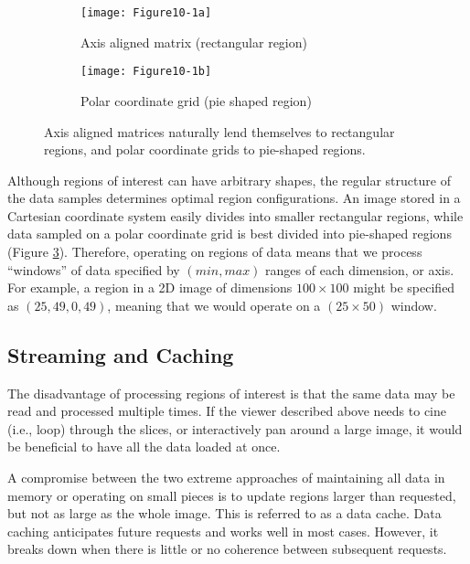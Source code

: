 \begin{figure}[htb]
	\begin{subfigure}[h]{0.36\linewidth}
		\texttt{[image: Figure10-1a]}
		\captionsetup{justification=centering}
		\caption*{Axis aligned matrix (rectangular region)}
		\label{fig:Figure10-1a}
	\end{subfigure}
	\hfill
	\begin{subfigure}[h]{0.36\linewidth}
	\end{subfigure}
	\hfill
	\begin{subfigure}[h]{0.36\linewidth}
		\texttt{[image: Figure10-1b]}
		\captionsetup{justification=centering}
		\caption*{Polar coordinate grid (pie shaped region)}
		\label{fig:Figure10-1b}
	\end{subfigure}
	\caption{Axis aligned matrices naturally lend themselves to rectangular regions, and polar coordinate grids to pie-shaped regions.}\label{fig:Figure10-1}
\end{figure}

Although regions of interest can have arbitrary shapes, the regular structure of the data samples determines optimal region configurations. An image stored in a Cartesian coordinate system easily divides into smaller rectangular regions, while data sampled on a polar coordinate grid is best divided into pie-shaped regions (Figure \ref{fig:Figure10-1}). Therefore, operating on regions of data means that we process ``windows'' of data specified by $(min,max)$ ranges of each dimension, or axis. For example, a region in a 2D image of dimensions $100 \times 100$ might be specified as $(25,49, 0,49)$, meaning that we would operate on a $(25 \times 50)$ window.

\subsection{Streaming and Caching}

The disadvantage of processing regions of interest is that the same data may be read and processed multiple times. If the viewer described above needs to cine (i.e., loop) through the slices, or interactively pan around a large image, it would be beneficial to have all the data loaded at once.

A compromise between the two extreme approaches of maintaining all data in memory or operating on small pieces is to update regions larger than requested, but not as large as the whole image. This is referred to as a data cache. Data caching anticipates future requests and works well in most cases. However, it breaks down when there is little or no coherence between subsequent requests.

